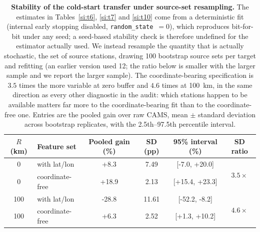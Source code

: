 \documentclass[11pt]{article}
\begin{document}
\begin{table}[htbp]\centering\footnotesize
\caption{\textbf{Stability of the cold-start transfer under source-set resampling.} The estimates in Tables~\ref{si:t6}, \ref{si:t7} and \ref{si:t10} come from a deterministic fit (internal early stopping disabled, \texttt{random\_state}~$=0$), which reproduces bit-for-bit under any seed; a seed-based stability check is therefore undefined for the estimator actually used. We instead resample the quantity that is actually stochastic, the set of source stations, drawing 100 bootstrap source sets per target and refitting (an earlier version used 12; the ratio below is smaller with the larger sample and we report the larger sample). The coordinate-bearing specification is $3.5$ times the more variable at zero buffer and $4.6$ times at 100~km, in the same direction as every other diagnostic in the audit: which stations happen to be available matters far more to the coordinate-bearing fit than to the coordinate-free one. Entries are the pooled gain over raw CAMS, mean $\pm$ standard deviation across bootstrap replicates, with the 2.5th--97.5th percentile interval.}
\label{si:t20}
\begin{tabular}{clcccc}\toprule
$R$ (km) & Feature set & Pooled gain (\%) & SD (pp) & 95\% interval (\%) & SD ratio \\ \midrule
0 & with lat/lon & +8.3 & 7.49 & [-7.0, +20.0] & \multirow{2}{*}{$3.5\times$} \\
0 & coordinate-free & +18.9 & 2.13 & [+15.4, +23.3] & \\
100 & with lat/lon & -28.8 & 11.61 & [-52.2, -8.2] & \multirow{2}{*}{$4.6\times$} \\
100 & coordinate-free & +6.3 & 2.52 & [+1.3, +10.2] & \\
\bottomrule\end{tabular}\end{table}
\end{document}
